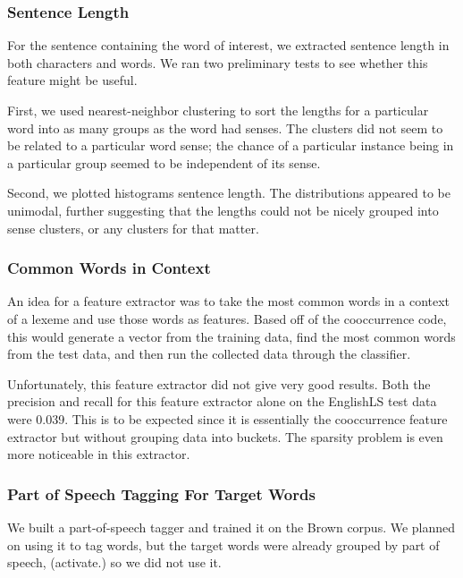 \documentclass{article}
\begin{document}
\subsubsection{Sentence Length}
For the sentence containing the word of interest, we extracted sentence length in both characters and words. We ran two preliminary tests to see whether this feature might be useful.

First, we used nearest-neighbor clustering to sort the lengths for a particular word into as many groups as the word had senses. The clusters did not seem to be related to a particular word sense; the chance of a particular instance being in a particular group seemed to be independent of its sense.

Second, we plotted histograms sentence length. The distributions appeared to be unimodal, further suggesting that the lengths could not be nicely grouped into sense clusters, or any clusters for that matter.

\subsubsection{Common Words in Context}
An idea for a feature extractor was to take the most common words in a context of a lexeme and use those words as features. Based off of the cooccurrence code, this would generate a vector from the training data, find the most common words from the test data, and then run the collected data through the classifier.

Unfortunately, this feature extractor did not give very good results. Both the precision and recall for this feature extractor alone on the EnglishLS test data were 0.039. This is to be expected since it is essentially the cooccurrence feature extractor but without grouping data into buckets. The sparsity problem is even more noticeable in this extractor.

\subsubsection{Part of Speech Tagging For Target Words}
We built a part-of-speech tagger and trained it on the Brown corpus. We planned on using it to tag words, but the target words were already grouped by part of speech, (activate.) so we did not use it.

\end{document}
